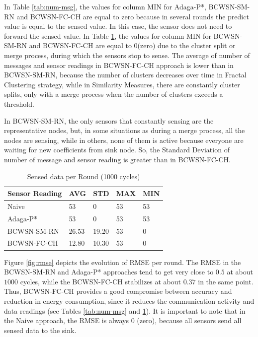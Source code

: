 \documentclass[conference]{IEEEtran}
\begin{document}
In Table \ref{tab:num-msg}, the values for column MIN for Adaga-P*, BCWSN-SM-RN
and BCWSN-FC-CH are equal to zero because in several rounds the predict value is
equal to the sensed value. In this case, the sensor does not need to forward the
sensed value. In Table \ref{tab:sens-read}, the values for column MIN for
BCWSN-SM-RN and BCWSN-FC-CH are equal to 0(zero) due to the cluster split or
merge process, during which the sensors stop to sense. 
The average of number of messages and sensor readings in BCWSN-FC-CH approach is
lower than in BCWSN-SM-RN, because the number of clusters decreases over time in
Fractal Clustering strategy, while in Similarity Measures, there are constantly
cluster splits, only with a merge process when the number of clusters exceeds a
threshold.

In BCWSN-SM-RN, the only sensors that constantly sensing are the representative
nodes, but, in some situations as during a merge process, all the nodes are
sensing, while in others, none of them is active because everyone are waiting
for new coefficients from sink node.
So, the Standard Deviation of number of message and sensor reading is greater
than in BCWSN-FC-CH.


\begin{table}[h!]
\caption{Sensed data per Round (1000 cycles)}
\label{tab:sens-read}
\begin{center}
\begin{tabular}{|l||l|l|l|l|}
\hline
Sensor Reading &AVG &STD &MAX &MIN \\
\hline\hline
Naive &53 &0 &53 &53 \\
\hline
Adaga-P* &53 &0 &53 &53 \\
\hline
BCWSN-SM-RN &26.53 &19.20 &53 &0 \\
\hline
BCWSN-FC-CH &12.80 &10.30 &53 &0 \\
\hline
\end{tabular}
\end{center}
\end{table}


Figure \ref{fig:rmse} depicts the evolution of RMSE per round. The RMSE in the
BCWSN-SM-RN and Adaga-P* approaches tend to get very close to $0.5$ at about $1000$
cycles, while the BCWSN-FC-CH stabilizes at about $0.37$ in the same point. Thus,
BCWSN-FC-CH provides a good compromise between accuracy and reduction in energy
consumption, since it reduces the communication activity and data readings (see
Tables \ref{tab:num-msg} and \ref{tab:sens-read}). It is important to note that
in the Naive approach, the RMSE is always 0 (zero), because all sensors send all
sensed data to the sink.
\end{document}
